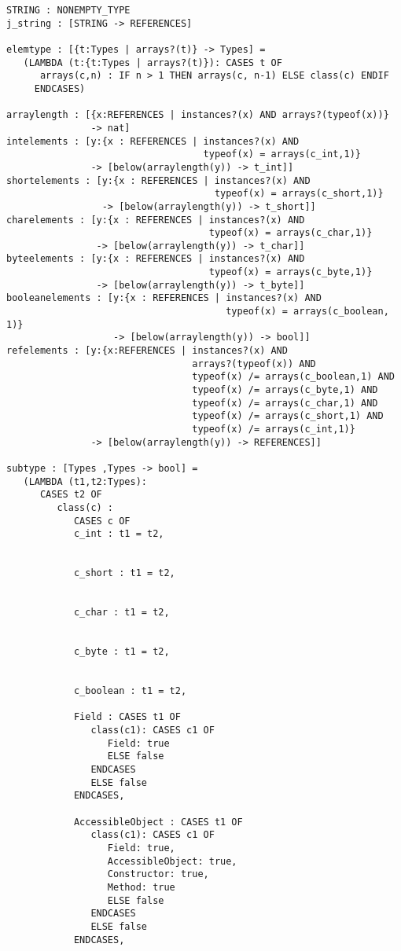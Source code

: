 \begin{verbatim}
STRING : NONEMPTY_TYPE
j_string : [STRING -> REFERENCES]

elemtype : [{t:Types | arrays?(t)} -> Types] =
   (LAMBDA (t:{t:Types | arrays?(t)}): CASES t OF
      arrays(c,n) : IF n > 1 THEN arrays(c, n-1) ELSE class(c) ENDIF
     ENDCASES)

arraylength : [{x:REFERENCES | instances?(x) AND arrays?(typeof(x))} 
               -> nat]
intelements : [y:{x : REFERENCES | instances?(x) AND 
                                   typeof(x) = arrays(c_int,1)} 
               -> [below(arraylength(y)) -> t_int]]
shortelements : [y:{x : REFERENCES | instances?(x) AND 
                                     typeof(x) = arrays(c_short,1)} 
                 -> [below(arraylength(y)) -> t_short]]
charelements : [y:{x : REFERENCES | instances?(x) AND 
                                    typeof(x) = arrays(c_char,1)} 
                -> [below(arraylength(y)) -> t_char]]
byteelements : [y:{x : REFERENCES | instances?(x) AND 
                                    typeof(x) = arrays(c_byte,1)} 
                -> [below(arraylength(y)) -> t_byte]]
booleanelements : [y:{x : REFERENCES | instances?(x) AND 
                                       typeof(x) = arrays(c_boolean, 1)} 
                   -> [below(arraylength(y)) -> bool]]
refelements : [y:{x:REFERENCES | instances?(x) AND 
                                 arrays?(typeof(x)) AND 
                                 typeof(x) /= arrays(c_boolean,1) AND 
                                 typeof(x) /= arrays(c_byte,1) AND 
                                 typeof(x) /= arrays(c_char,1) AND 
                                 typeof(x) /= arrays(c_short,1) AND 
                                 typeof(x) /= arrays(c_int,1)} 
               -> [below(arraylength(y)) -> REFERENCES]]

subtype : [Types ,Types -> bool] =
   (LAMBDA (t1,t2:Types):
      CASES t2 OF
         class(c) :
            CASES c OF
            c_int : t1 = t2,


            c_short : t1 = t2,


            c_char : t1 = t2,


            c_byte : t1 = t2,


            c_boolean : t1 = t2,

            Field : CASES t1 OF
               class(c1): CASES c1 OF
                  Field: true
                  ELSE false
               ENDCASES
               ELSE false
            ENDCASES,

            AccessibleObject : CASES t1 OF
               class(c1): CASES c1 OF
                  Field: true,
                  AccessibleObject: true,
                  Constructor: true,
                  Method: true
                  ELSE false
               ENDCASES
               ELSE false
            ENDCASES,


\end{verbatim}
